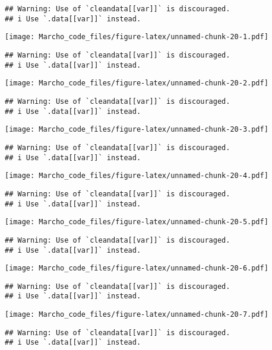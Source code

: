 \documentclass[
]{article}
\begin{document}
\begin{verbatim}
## Warning: Use of `cleandata[[var]]` is discouraged.
## i Use `.data[[var]]` instead.
\end{verbatim}

\texttt{[image: Marcho\_code\_files/figure-latex/unnamed-chunk-20-1.pdf]}

\begin{verbatim}
## Warning: Use of `cleandata[[var]]` is discouraged.
## i Use `.data[[var]]` instead.
\end{verbatim}

\texttt{[image: Marcho\_code\_files/figure-latex/unnamed-chunk-20-2.pdf]}

\begin{verbatim}
## Warning: Use of `cleandata[[var]]` is discouraged.
## i Use `.data[[var]]` instead.
\end{verbatim}

\texttt{[image: Marcho\_code\_files/figure-latex/unnamed-chunk-20-3.pdf]}

\begin{verbatim}
## Warning: Use of `cleandata[[var]]` is discouraged.
## i Use `.data[[var]]` instead.
\end{verbatim}

\texttt{[image: Marcho\_code\_files/figure-latex/unnamed-chunk-20-4.pdf]}

\begin{verbatim}
## Warning: Use of `cleandata[[var]]` is discouraged.
## i Use `.data[[var]]` instead.
\end{verbatim}

\texttt{[image: Marcho\_code\_files/figure-latex/unnamed-chunk-20-5.pdf]}

\begin{verbatim}
## Warning: Use of `cleandata[[var]]` is discouraged.
## i Use `.data[[var]]` instead.
\end{verbatim}

\texttt{[image: Marcho\_code\_files/figure-latex/unnamed-chunk-20-6.pdf]}

\begin{verbatim}
## Warning: Use of `cleandata[[var]]` is discouraged.
## i Use `.data[[var]]` instead.
\end{verbatim}

\texttt{[image: Marcho\_code\_files/figure-latex/unnamed-chunk-20-7.pdf]}

\begin{verbatim}
## Warning: Use of `cleandata[[var]]` is discouraged.
## i Use `.data[[var]]` instead.
\end{verbatim}
\end{document}
